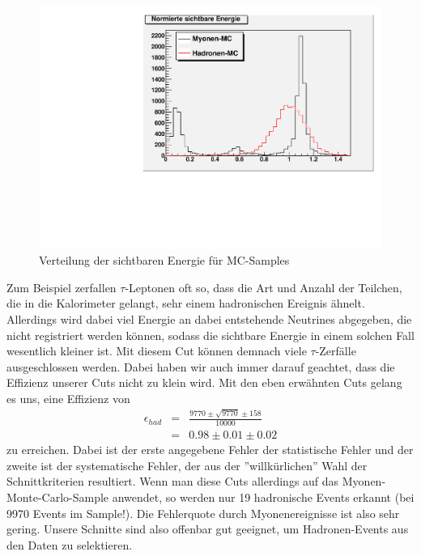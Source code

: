 \begin{figure}[htb]
	\centering
	\includegraphics[width=1\columnwidth,keepaspectratio]{Evisvgl_mc.pdf}
	\caption{Verteilung der sichtbaren Energie für MC-Samples}
	\label{fig:Evisvgl_mc}
\end{figure}
Zum Beispiel zerfallen $\tau$-Leptonen oft so, dass die Art und Anzahl der Teilchen, die in die Kalorimeter gelangt, sehr einem hadronischen Ereignis ähnelt. Allerdings wird dabei viel Energie an dabei entstehende Neutrines abgegeben, die nicht registriert werden können, sodass die sichtbare Energie in einem solchen Fall wesentlich kleiner ist. Mit diesem Cut können demnach viele $\tau$-Zerfälle ausgeschlossen werden. Dabei haben wir auch immer darauf geachtet, dass die Effizienz unserer Cuts nicht zu klein wird. Mit den eben erwähnten Cuts gelang es uns, eine Effizienz von
\begin{eqnarray}
\epsilon_{had} &=& \frac{9770 \pm \sqrt{9770} \pm 158}{10000}\\
&=& 0.98 \pm 0.01 \pm 0.02
\end{eqnarray}
zu erreichen. Dabei ist der erste angegebene Fehler der statistische Fehler und der zweite ist der systematische Fehler, der aus der ''willkürlichen'' Wahl der Schnittkriterien resultiert. Wenn man diese Cuts allerdings auf das Myonen-Monte-Carlo-Sample anwendet, so werden nur 19 hadronische Events erkannt (bei 9970 Events im Sample!). Die Fehlerquote durch Myonenereignisse ist also sehr gering. Unsere Schnitte sind also offenbar gut geeignet, um Hadronen-Events aus den Daten zu selektieren.

